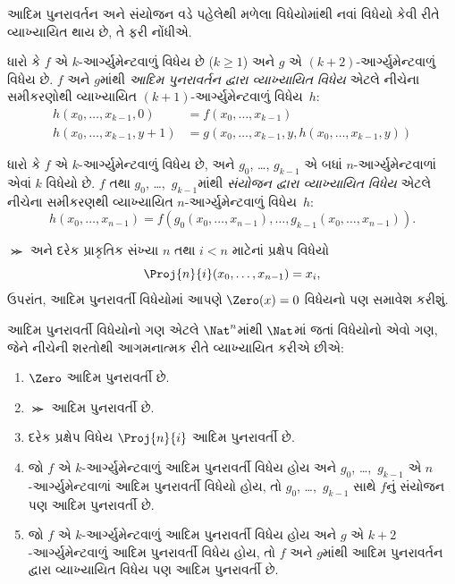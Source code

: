 \documentclass[../../../include/open-logic-section]{subfiles}
\begin{document}

આદિમ પુનરાવર્તન અને સંયોજન વડે પહેલેથી મળેલા વિધેયોમાંથી નવાં વિધેયો
કેવી રીતે વ્યાખ્યાયિત થાય છે, તે ફરી નોંધીએ.

\begin{defn}
   ધારો કે $f$ એ $k$-આર્ગ્યુમેન્ટવાળું
  વિધેય છે ($k\ge 1$) અને $g$ એ $(k+2)$-આર્ગ્યુમેન્ટવાળું વિધેય છે.
  $f$ અને $g$માંથી \emph{આદિમ પુનરાવર્તન દ્વારા વ્યાખ્યાયિત વિધેય}
  એટલે નીચેના સમીકરણોથી વ્યાખ્યાયિત $(k+1)$-આર્ગ્યુમેન્ટવાળું
  વિધેય~$h$:
  \begin{align*}
    h(x_0,\dots,x_{k-1},0) & =  f(x_0,\dots,x_{k-1}) \\
    h(x_0,\dots,x_{k-1},y+1) & = g(x_0,\dots,x_{k-1}, y, h(x_0,\dots,x_{k-1}, y))
  \end{align*}
\end{defn}

\begin{defn}
   ધારો કે $f$ એ $k$-આર્ગ્યુમેન્ટવાળું
  વિધેય છે, અને $g_0$, \dots, $g_{k-1}$ એ બધાં
  $n$-આર્ગ્યુમેન્ટવાળાં એવાં $k$ વિધેયો છે. $f$ તથા
  $g_0$, \dots,~$g_{k-1}$માંથી \emph{સંયોજન દ્વારા વ્યાખ્યાયિત વિધેય}
  એટલે નીચેના સમીકરણથી વ્યાખ્યાયિત $n$-આર્ગ્યુમેન્ટવાળું વિધેય~$h$:
  \[
  h(x_0, \dots, x_{n-1}) =
  f(g_0(x_0, \dots, x_{n-1}), \dots, g_{k-1}(x_0, \dots, x_{n-1})).
  \]
\end{defn}

$\Succ$ અને દરેક પ્રાકૃતિક સંખ્યા $n$ તથા $i < n$ માટેનાં પ્રક્ષેપ
વિધેયો
\[
\Proj{n}{i}(x_0,\dots,x_{n-1}) = x_i,
\]
ઉપરાંત, આદિમ પુનરાવર્તી વિધેયોમાં આપણે $\Zero(x) = 0$ વિધેયનો પણ
સમાવેશ કરીશું.

\begin{defn}
  આદિમ પુનરાવર્તી વિધેયોનો ગણ એટલે $\Nat^n$માંથી $\Nat$માં જતાં
  વિધેયોનો એવો ગણ, જેને નીચેની શરતોથી આગમનાત્મક રીતે વ્યાખ્યાયિત
  કરીએ છીએ:
  \begin{enumerate}
  \item $\Zero$ આદિમ પુનરાવર્તી છે.
  \item $\Succ$ આદિમ પુનરાવર્તી છે.
  \item દરેક પ્રક્ષેપ વિધેય $\Proj{n}{i}$ આદિમ પુનરાવર્તી છે.
  \item જો $f$ એ $k$-આર્ગ્યુમેન્ટવાળું આદિમ પુનરાવર્તી વિધેય હોય અને
    $g_0$, \dots,~$g_{k-1}$ એ $n$-આર્ગ્યુમેન્ટવાળાં આદિમ
    પુનરાવર્તી વિધેયો હોય, તો $g_0$, \dots,~$g_{k-1}$ સાથે $f$નું
    સંયોજન પણ આદિમ પુનરાવર્તી છે.
  \item જો $f$ એ $k$-આર્ગ્યુમેન્ટવાળું આદિમ પુનરાવર્તી વિધેય હોય અને
    $g$ એ $k+2$-આર્ગ્યુમેન્ટવાળું આદિમ પુનરાવર્તી વિધેય હોય, તો
    $f$ અને $g$માંથી આદિમ પુનરાવર્તન દ્વારા વ્યાખ્યાયિત વિધેય પણ
    આદિમ પુનરાવર્તી છે.
\end{enumerate}
\end{defn}
\end{document}
